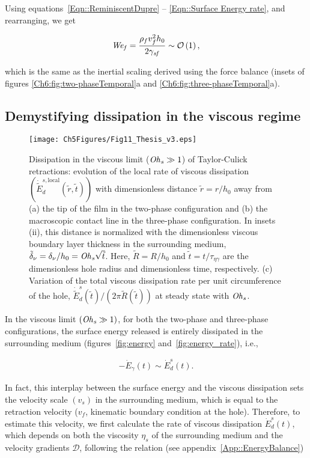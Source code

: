 \noindent Using equations~\eqref{Eqn::ReminiscentDupre} -- \eqref{Eqn::Surface Energy rate}, and rearranging, we get

\begin{align}
	\mathit{We}_\mathit{f} = \frac{\rho_fv_f^2h_0}{2\gamma_\mathit{sf}} \sim \mathcal{O}\left(1\right),
\end{align}

\noindent which is the same as the inertial scaling derived using the force balance (insets of figures \ref{Ch6:fig:two-phaseTemporal}a and \ref{Ch6:fig:three-phaseTemporal}a).

\subsection{Demystifying dissipation in the viscous regime}\label{sec:energetics viscous}
\begin{sidewaysfigure}
	\centering
	\texttt{[image: Ch5Figures/Fig11\_Thesis\_v3.eps]}
	\caption{Dissipation in the viscous limit ($\mathit{Oh}_\mathit{s} \gg 1$) of Taylor-Culick retractions: evolution of the local rate of viscous dissipation $\left(\dot{\tilde{E}}_d^{s, \text{local}}\left(\tilde{r}, \tilde{t}\right)\right)$ with dimensionless distance $\tilde{r} = r/h_0$ away from (a) the tip of the film in the two-phase configuration and (b) the macroscopic contact line in the three-phase configuration. In insets (ii), this distance is normalized with the dimensionless viscous boundary layer thickness in the surrounding medium, $\tilde{\delta}_\nu = \delta_\nu/h_0 = \mathit{Oh}_\mathit{s}\sqrt{\tilde{t}}$. Here, $\tilde{R} = R/h_0$ and $\tilde{t} = t/\tau_{\eta\gamma}$ are the dimensionless hole radius and dimensionless time, respectively. (c) Variation of the total viscous dissipation rate per unit circumference of the hole, $\dot{\tilde{E}}_d^{s}\left(\tilde{t}\right)/(2\pi\tilde{R}\left(\tilde{t}\right))$ at steady state with $\mathit{Oh}_\mathit{s}$.}
	\label{fig:dissipation}
\end{sidewaysfigure}

In the viscous limit $\left(\mathit{Oh}_\mathit{s} \gg 1\right)$, for both the two-phase and three-phase configurations, the surface energy released is entirely dissipated in the surrounding medium (figures~\ref{fig:energy} and~\ref{fig:energy_rate}), i.e.,

\begin{align}
	-\dot{E}_\gamma(t) \sim \dot{E}_d^{s}(t).
	\label{Eqn::Viscous energy balance}
\end{align}

\noindent In fact, this interplay between the surface energy and the viscous dissipation sets the velocity scale $\left(v_s\right)$ in the surrounding medium, which is equal to the retraction velocity ($v_f$, kinematic boundary condition at the hole). Therefore, to estimate this velocity, we first calculate the rate of viscous dissipation $\dot{E}_d^{s}(t)$, which depends on both the viscosity $\eta_{s}$ of the surrounding medium and the velocity gradients $\boldsymbol{\mathcal{D}}$, following the relation (see appendix~\ref{App::EnergyBalance})

